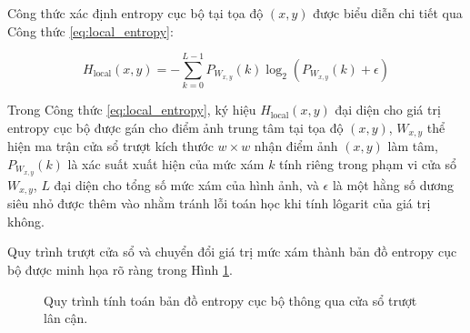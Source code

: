Công thức xác định entropy cục bộ tại tọa độ $(x,y)$ được biểu diễn chi tiết qua Công thức \ref{eq:local_entropy}:

\begin{equation}
H_{\text{local}}(x,y) = -\sum_{k=0}^{L-1} P_{W_{x,y}}(k) \log_2 \left( P_{W_{x,y}}(k) + \epsilon \right)
\label{eq:local_entropy}
\end{equation}

Trong Công thức \ref{eq:local_entropy}, ký hiệu $H_{\text{local}}(x,y)$ đại diện cho giá trị entropy cục bộ được gán cho điểm ảnh trung tâm tại tọa độ $(x,y)$, $W_{x,y}$ thể hiện ma trận cửa sổ trượt kích thước $w \times w$ nhận điểm ảnh $(x,y)$ làm tâm, $P_{W_{x,y}}(k)$ là xác suất xuất hiện của mức xám $k$ tính riêng trong phạm vi cửa sổ $W_{x,y}$, $L$ đại diện cho tổng số mức xám của hình ảnh, và $\epsilon$ là một hằng số dương siêu nhỏ được thêm vào nhằm tránh lỗi toán học khi tính lôgarit của giá trị không.

Quy trình trượt cửa sổ và chuyển đổi giá trị mức xám thành bản đồ entropy cục bộ được minh họa rõ ràng trong Hình \ref{fig:local_entropy_pipeline}.

\begin{figure}[h!]
\centering
{}
\caption{Quy trình tính toán bản đồ entropy cục bộ thông qua cửa sổ trượt lân cận.}
\label{fig:local_entropy_pipeline}
\end{figure}



